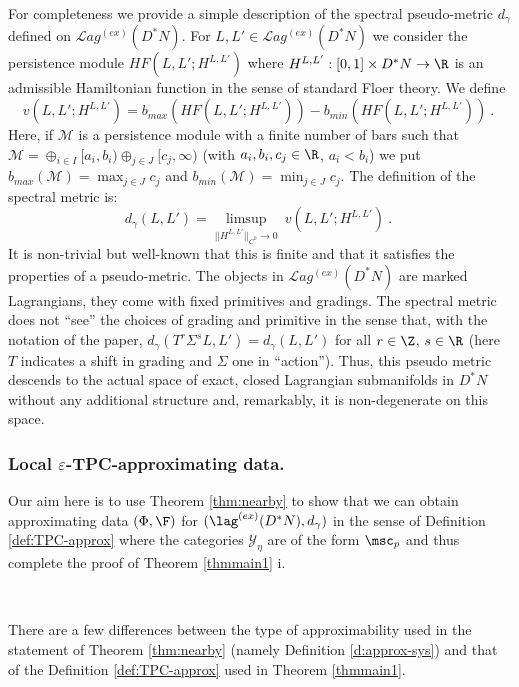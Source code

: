  \begin{rem}\label{rem:spectral_d}
 For completeness we provide a simple description of the spectral pseudo-metric $d_{\gamma}$ defined on 
 $\mathcal{L}ag^{(ex)}(D^{\ast}N)$. For $L, L'\in \mathcal{L}ag^{(ex)}(D^{\ast}N)$ we consider the persistence
module $HF(L,L'; H^{L,L'})$ where $H^{L,L'}:[0,1]\times D^{\ast} N \to \R$ is an  admissible Hamiltonian function in the sense of standard Floer theory. We define 
$$v (L,L';  H^{L,L'})=b_{max}(HF(L,L'; H^{L,L'}))-b_{min}(HF(L,L'; H^{L,L'}))~.~$$ Here, if $\mathcal{M}$ is a persistence module with a finite number of bars  such that $\mathcal{M}=\oplus_{i\in I} [a_{i}, b_{i}) \oplus_{j\in J} [c_{j}, \infty)$ (with $a_{i}, b_{i}, c_{j}\in \R$, $a_{i}<b_{i}$) we put $b_{max}(\mathcal{M})= \max_{j\in J} c_{j}$ and $b_{min}(\mathcal{M})=\min_{j\in J} c_{j}$.
The definition of the spectral metric is:
$$d_{\gamma}(L,L')=\limsup_{|| H^{L,L'} ||_{C^{0}}\to 0}  \ v(L,L'; H^{L,L'}) ~.~$$
It is non-trivial but well-known that this is finite and that it satisfies the properties of a pseudo-metric.
The objects in $\mathcal{L}ag^{(ex)}(D^{\ast}N)$ are marked Lagrangians, they come with fixed primitives and gradings. The spectral metric does not ``see'' the choices of grading  and primitive in the sense that, with the notation of the paper, $d_{\gamma}(T^{r}\Sigma^{s}L,L')=d_{\gamma}(L,L')$ for all $r\in \Z$, $s\in \R$
 (here $T$ indicates a shift in grading and $\Sigma$ one in ``action''). Thus, this pseudo metric descends to the actual space of exact, closed Lagrangian submanifolds in $D^{\ast}N$ without any additional structure and, remarkably, 
 it is non-degenerate on this space. 
 \end{rem} 
 
 \subsubsection{Local $\varepsilon$-TPC-approximating data.}\label{subsubsec:local_approx_d}

Our aim here is to use Theorem \ref{thm:nearby} to show that we can obtain approximating data $(\Phi,\F)$
for $(\lag^{(ex)}(D^{\ast}N), d_{\gamma})$ in the sense of Definition \ref{def:TPC-approx} where the categories $\mathscr{Y}_{\eta}$ are of the form $\msc_{p}$ and thus complete the proof of Theorem \ref{thmmain1} i.

\

There are a few differences between the type of approximability used in the  statement of Theorem \ref{thm:nearby} (namely Definition \ref{d:approx-sys}) and that of 
the Definition \ref{def:TPC-approx} used in Theorem \ref{thmmain1}. 

